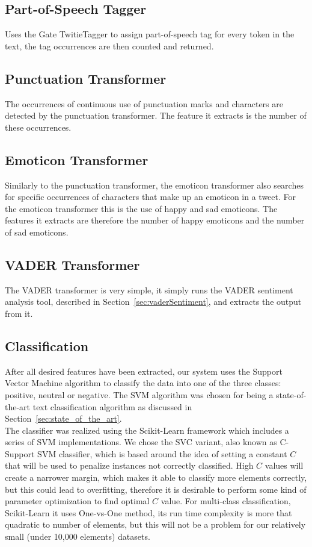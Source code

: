 \subsection*{Part-of-Speech Tagger}
Uses the Gate TwitieTagger to assign part-of-speech tag for every token in the text, the tag occurrences are then counted and returned.

\subsection*{Punctuation Transformer}
The occurrences of continuous use of punctuation marks and characters are detected by the punctuation transformer. The feature it extracts is the number of these occurrences. 

\subsection*{Emoticon Transformer}
Similarly to the punctuation transformer, the emoticon transformer also searches for specific occurrences of characters that make up an emoticon in a tweet. For the emoticon transformer this is the use of happy and sad emoticons. The features it extracts are therefore the number of happy emoticons and the number of sad emoticons.

\subsection*{VADER Transformer}
The VADER transformer is very simple, it simply runs the VADER sentiment analysis tool, described in Section~\ref{sec:vaderSentiment}, and extracts the output from it.

\subsection{Classification}
\label{sec:arch_classification}
After all desired features have been extracted, our system uses the Support Vector Machine algorithm to classify the data into one of the three classes: positive, neutral or negative. The SVM algorithm was chosen for being a state-of-the-art text classification algorithm as discussed in Section~\ref{sec:state_of_the_art}.  \\

The classifier was realized using the Scikit-Learn framework which includes a series of SVM implementations. We chose the SVC variant, also known as C-Support SVM classifier, which is based around the idea of setting a constant $C$ that will be used to penalize instances not correctly classified. High $C$ values will create a narrower margin, which makes it able to classify more elements correctly, but this could lead to overfitting, therefore it is desirable to perform some kind of parameter optimization to find optimal $C$ value. For multi-class classification, Scikit-Learn it uses One-vs-One method, its run time complexity is more that quadratic to number of elements, but this will not be a problem for our relatively small (under 10,000 elements) datasets.


